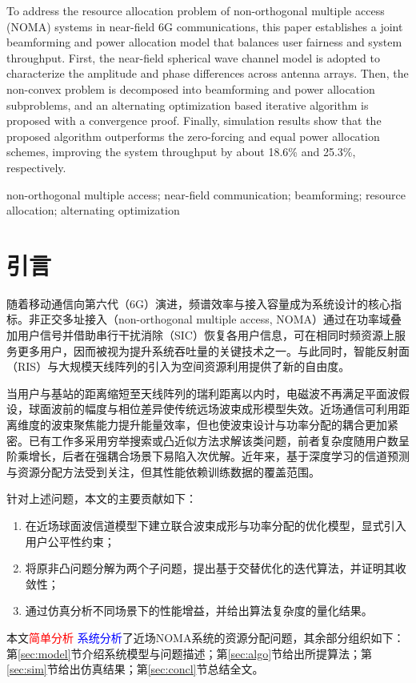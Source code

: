 \documentclass[UTF8, a4paper, zihao=-4, fontset=windows, twocolumn]{ctexart}
\newcommand{\textdelet}[1]{\textcolor{red}{#1}}   %
\newcommand{\textadd}[1]{\textcolor{blue}{#1}}    %
\theoremstyle{plain}
\theoremstyle{definition}
\theoremstyle{plain}
\begin{document}
\begingroup
\sloppy
{}
 To address the resource allocation problem of non-orthogonal multiple access (NOMA) systems in near-field 6G communications, this paper establishes a joint beamforming and power allocation model that balances user fairness and system throughput. First, the near-field spherical wave channel model is adopted to characterize the amplitude and phase differences across antenna arrays. Then, the non-convex problem is decomposed into beamforming and power allocation subproblems, and an alternating optimization based iterative algorithm is proposed with a convergence proof. Finally, simulation results show that the proposed algorithm outperforms the zero-forcing and equal power allocation schemes, improving the system throughput by about 18.6\% and 25.3\%, respectively.
\par\vspace{0.2em}
 non-orthogonal multiple access; near-field communication; beamforming; resource allocation; alternating optimization
\endgroup
\twocolumn


\section{引言}

随着移动通信向第六代（6G）演进，频谱效率与接入容量成为系统设计的核心指标。非正交多址接入（non-orthogonal multiple access, NOMA）通过在功率域叠加用户信号并借助串行干扰消除（SIC）恢复各用户信息，可在相同时频资源上服务更多用户，因而被视为提升系统吞吐量的关键技术之一\cite{zhang2020noma}。与此同时，智能反射面（RIS）与大规模天线阵列的引入为空间资源利用提供了新的自由度\cite{liu2021ris,li2020deep,smith2021survey}。

当用户与基站的距离缩短至天线阵列的瑞利距离以内时，电磁波不再满足平面波假设，球面波前的幅度与相位差异使传统远场波束成形模型失效\cite{wang2022near}。近场通信可利用距离维度的波束聚焦能力提升能量效率，但也使波束设计与功率分配的耦合更加紧密\cite{kim2022beam}。已有工作多采用穷举搜索或凸近似方法求解该类问题，前者复杂度随用户数呈阶乘增长\cite{rao2019conf}，后者在强耦合场景下易陷入次优解\cite{chen2019thesis}。近年来，基于深度学习的信道预测与资源分配方法受到关注\cite{sun2022conf}，但其性能依赖训练数据的覆盖范围\cite{zhao2023resource}。

针对上述问题，本文的主要贡献如下：
\begin{enumerate}
  \item 在近场球面波信道模型下建立联合波束成形与功率分配的优化模型，显式引入用户公平性约束；
  \item 将原非凸问题分解为两个子问题，提出基于交替优化的迭代算法，并证明其收敛性；
  \item 通过仿真分析不同场景下的性能增益，并给出算法复杂度的量化结果。
\end{enumerate}
本文\textdelet{简单分析} \textadd{系统分析}了近场NOMA系统的资源分配问题，其余部分组织如下：第\ref{sec:model}节介绍系统模型与问题描述；第\ref{sec:algo}节给出所提算法；第\ref{sec:sim}节给出仿真结果；第\ref{sec:concl}节总结全文。
\end{document}
